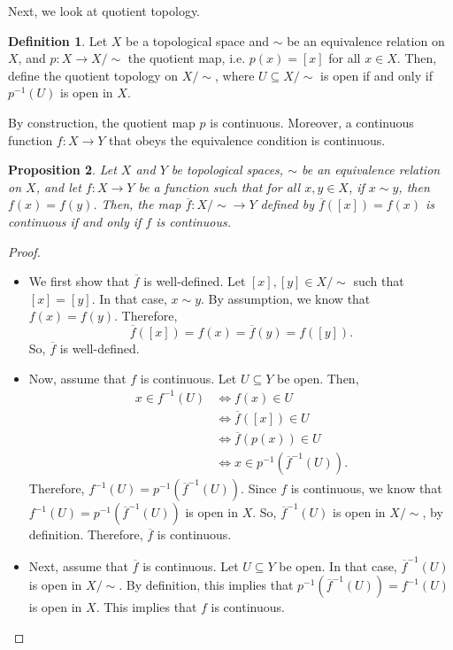 \documentclass[a4paper, openany]{memoir}
\theoremstyle{definition}
\newtheorem{definition}{Definition}[section]
\theoremstyle{plain}
\newtheorem{proposition}[definition]{Proposition}
\begin{document}
Next, we look at quotient topology. 
\begin{definition}
Let $X$ be a topological space and $\sim$ be an equivalence relation on $X$, and $p: X \to X/\sim$ the quotient map, i.e. $p(x) = [x]$ for all $x \in X$. Then, define the quotient topology on $X/\sim$, where $U \subseteq X/\sim$ is open if and only if $p^{-1}(U)$ is open in $X$. 
\end{definition}
\noindent By construction, the quotient map $p$ is continuous. Moreover, a continuous function $f: X \to Y$ that obeys the equivalence condition is continuous.
\begin{proposition}
Let $X$ and $Y$ be topological spaces, $\sim$ be an equivalence relation on $X$, and let $f: X \to Y$ be a function such that for all $x, y \in X$, if $x \sim y$, then $f(x) = f(y)$. Then, the map $\overline{f}: X/\sim \to Y$ defined by $\overline{f}([x]) = f(x)$ is continuous if and only if $f$ is continuous.
\end{proposition}
\begin{proof}
\hspace*{0pt}
\begin{itemize}
    \item We first show that $\overline{f}$ is well-defined. Let $[x], [y] \in X/\sim$ such that $[x] = [y]$. In that case, $x \sim y$. By assumption, we know that $f(x) = f(y)$. Therefore,
    \[\overline{f}([x]) = f(x) = \overline{f}(y) = f([y]).\]
    So, $\overline{f}$ is well-defined.
    
    \item Now, assume that $f$ is continuous. Let $U \subseteq Y$ be open. Then, 
    \begin{align*}
        x \in f^{-1}(U) &\iff f(x) \in U \\
        &\iff \overline{f}([x]) \in U \\
        &\iff \overline{f}(p(x)) \in U \\
        &\iff x \in p^{-1}(\overline{f}^{-1}(U)).
    \end{align*}
    Therefore, $f^{-1}(U) = p^{-1}(\overline{f}^{-1}(U))$. Since $f$ is continuous, we know that $f^{-1}(U) = p^{-1}(\overline{f}^{-1}(U))$ is open in $X$. So, $\overline{f}^{-1}(U)$ is open in $X/\sim$, by definition. Therefore, $\overline{f}$ is continuous.
    
    \item Next, assume that $\overline{f}$ is continuous. Let $U \subseteq Y$ be open. In that case, $\overline{f}^{-1}(U)$ is open in $X/\sim$. By definition, this implies that $p^{-1}(\overline{f}^{-1}(U)) = f^{-1}(U)$ is open in $X$. This implies that $f$ is continuous.
\end{itemize}
\end{proof}
\end{document}
